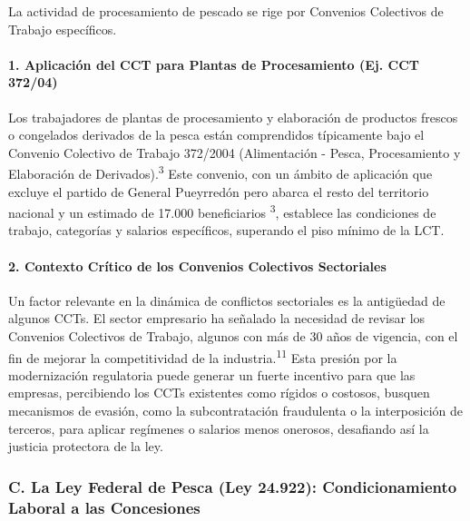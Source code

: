 \documentclass[]{article}
\begin{document}
La actividad de procesamiento de pescado se rige por Convenios
Colectivos de Trabajo específicos.

\hypertarget{aplicaciuxf3n-del-cct-para-plantas-de-procesamiento-ej.-cct-37204}{%
\paragraph{1. Aplicación del CCT para Plantas de Procesamiento (Ej. CCT
372/04)}\label{aplicaciuxf3n-del-cct-para-plantas-de-procesamiento-ej.-cct-37204}}

Los trabajadores de plantas de procesamiento y elaboración de productos
frescos o congelados derivados de la pesca están comprendidos
típicamente bajo el Convenio Colectivo de Trabajo 372/2004 (Alimentación
- Pesca, Procesamiento y Elaboración de Derivados).\textsuperscript{3}
Este convenio, con un ámbito de aplicación que excluye el partido de
General Pueyrredón pero abarca el resto del territorio nacional y un
estimado de 17.000 beneficiarios \textsuperscript{3}, establece las
condiciones de trabajo, categorías y salarios específicos, superando el
piso mínimo de la LCT.

\hypertarget{contexto-cruxedtico-de-los-convenios-colectivos-sectoriales}{%
\paragraph{2. Contexto Crítico de los Convenios Colectivos
Sectoriales}\label{contexto-cruxedtico-de-los-convenios-colectivos-sectoriales}}

Un factor relevante en la dinámica de conflictos sectoriales es la
antigüedad de algunos CCTs. El sector empresario ha señalado la
necesidad de revisar los Convenios Colectivos de Trabajo, algunos con
más de 30 años de vigencia, con el fin de mejorar la competitividad de
la industria.\textsuperscript{11} Esta presión por la modernización
regulatoria puede generar un fuerte incentivo para que las empresas,
percibiendo los CCTs existentes como rígidos o costosos, busquen
mecanismos de evasión, como la subcontratación fraudulenta o la
interposición de terceros, para aplicar regímenes o salarios menos
onerosos, desafiando así la justicia protectora de la ley.

\hypertarget{c.-la-ley-federal-de-pesca-ley-24.922-condicionamiento-laboral-a-las-concesiones}{%
\subsubsection{C. La Ley Federal de Pesca (Ley 24.922): Condicionamiento
Laboral a las
Concesiones}\label{c.-la-ley-federal-de-pesca-ley-24.922-condicionamiento-laboral-a-las-concesiones}}
\end{document}
